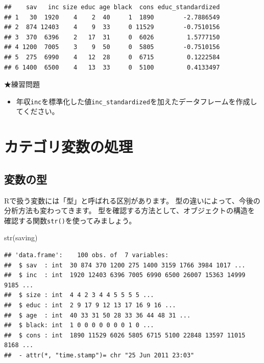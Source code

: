 \documentclass[
]{book}
\newenvironment{Shaded}{\begin{snugshade}}{\end{snugshade}}
\newcommand{\FunctionTok}[1]{\textcolor[rgb]{0.00,0.00,0.00}{#1}}
\newcommand{\NormalTok}[1]{#1}
\providecommand{\tightlist}{%
  \setlength{\itemsep}{0pt}\setlength{\parskip}{0pt}}
\begin{document}
\begin{verbatim}
##    sav   inc size educ age black  cons educ_standardized
## 1   30  1920    4    2  40     1  1890        -2.7886549
## 2  874 12403    4    9  33     0 11529        -0.7510156
## 3  370  6396    2   17  31     0  6026         1.5777150
## 4 1200  7005    3    9  50     0  5805        -0.7510156
## 5  275  6990    4   12  28     0  6715         0.1222584
## 6 1400  6500    4   13  33     0  5100         0.4133497
\end{verbatim}

★練習問題

\begin{itemize}
\tightlist
\item
  年収\texttt{inc}を標準化した値\texttt{inc\_standardized}を加えたデータフレームを作成してください。
\end{itemize}

\hypertarget{ux30abux30c6ux30b4ux30eaux5909ux6570ux306eux51e6ux7406}{%
\section{カテゴリ変数の処理}\label{ux30abux30c6ux30b4ux30eaux5909ux6570ux306eux51e6ux7406}}

\hypertarget{ux5909ux6570ux306eux578b}{%
\subsection{変数の型}\label{ux5909ux6570ux306eux578b}}

Rで扱う変数には「型」と呼ばれる区別があります。
型の違いによって、今後の分析方法も変わってきます。
型を確認する方法として、オブジェクトの構造を確認する関数\texttt{str()}を使ってみましょう。

\begin{Shaded}
\begin{Highlighting}[]
\FunctionTok{str}\NormalTok{(saving)}
\end{Highlighting}
\end{Shaded}

\begin{verbatim}
## 'data.frame':    100 obs. of  7 variables:
##  $ sav  : int  30 874 370 1200 275 1400 3159 1766 3984 1017 ...
##  $ inc  : int  1920 12403 6396 7005 6990 6500 26007 15363 14999 9185 ...
##  $ size : int  4 4 2 3 4 4 5 5 5 5 ...
##  $ educ : int  2 9 17 9 12 13 17 16 9 16 ...
##  $ age  : int  40 33 31 50 28 33 36 44 48 31 ...
##  $ black: int  1 0 0 0 0 0 0 0 1 0 ...
##  $ cons : int  1890 11529 6026 5805 6715 5100 22848 13597 11015 8168 ...
##  - attr(*, "time.stamp")= chr "25 Jun 2011 23:03"
\end{verbatim}
\end{document}
